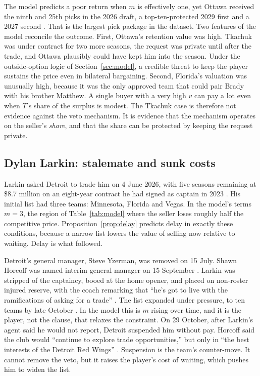 The model predicts a poor return when $m$ is effectively one, yet Ottawa received the ninth and 25th picks in the 2026 draft, a top-ten-protected 2029 first and a 2027 second \citep{fourthperiod_tkachuk}. That is the largest pick package in the dataset. Two features of the model reconcile the outcome. First, Ottawa's retention value was high. Tkachuk was under contract for two more seasons, the request was private until after the trade, and Ottawa plausibly could have kept him into the season. Under the outside-option logic of Section~\ref{sec:model}, a credible threat to keep the player sustains the price even in bilateral bargaining. Second, Florida's valuation was unusually high, because it was the only approved team that could pair Brady with his brother Matthew. A single buyer with a very high $v$ can pay a lot even when $T$'s share of the surplus is modest. The Tkachuk case is therefore not evidence against the veto mechanism. It is evidence that the mechanism operates on the seller's \emph{share}, and that the share can be protected by keeping the request private.

\subsection{Dylan Larkin: stalemate and sunk costs}

Larkin asked Detroit to trade him on 4 June 2026, with five seasons remaining at \$8.7 million on an eight-year contract he had signed as captain in 2023 \citep{wilx_larkin,nhl_larkin}. His initial list had three teams: Minnesota, Florida and Vegas. In the model's terms $m=3$, the region of Table~\ref{tab:model} where the seller loses roughly half the competitive price. Proposition~\ref{prop:delay} predicts delay in exactly these conditions, because a narrow list lowers the value of selling now relative to waiting. Delay is what followed.

Detroit's general manager, Steve Yzerman, was removed on 15 July. Shawn Horcoff was named interim general manager on 15 September \citep{nhl_horcoff}. Larkin was stripped of the captaincy, booed at the home opener, and placed on non-roster injured reserve, with the coach remarking that ``he's got to live with the ramifications of asking for a trade'' \citep{espn_larkin_ir}. The list expanded under pressure, to ten teams by late October \citep{dfo_larkin_list}. In the model this is $m$ rising over time, and it is the player, not the clause, that relaxes the constraint. On 29 October, after Larkin's agent said he would not report, Detroit suspended him without pay. Horcoff said the club would ``continue to explore trade opportunities,'' but only in ``the best interests of the Detroit Red Wings'' \citep{cod_larkin_suspended}. Suspension is the team's counter-move. It cannot remove the veto, but it raises the player's cost of waiting, which pushes him to widen the list.

